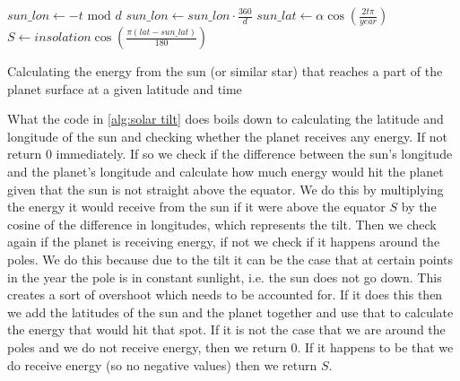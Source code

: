 \begin{algorithm}
    $sun\_lon \leftarrow -t \text{ mod } d$ \;
    $sun\_lon \leftarrow sun\_lon \cdot \frac{360}{d}$ \;
    $sun\_lat \leftarrow \alpha\cos(\frac{2t\pi}{year})$ \;
    $S \leftarrow insolation\cos(\frac{\pi(lat - sun\_lat)}{180})$ \;

     
    \caption{Calculating the energy from the sun (or similar star) that reaches a part of the planet surface at a given latitude and time}
    \label{alg:solar tilt}
\end{algorithm}

What the code in \autoref{alg:solar tilt} does boils down to calculating the latitude and longitude of the sun and checking whether the planet receives any energy. If not return $0$ immediately.
If so we check if the difference between the sun's longitude and the planet's longitude and calculate how much energy would hit the planet given that the sun is not straight above the equator. 
We do this by multiplying the energy it would receive from the sun if it were above the equator $S$ by the cosine of the difference in longitudes, which represents the tilt. Then we check again 
if the planet is receiving energy, if not we check if it happens around the poles. We do this because due to the tilt it can be the case that at certain points in the year the pole is in constant
sunlight, i.e. the sun does not go down. This creates a sort of overshoot which needs to be accounted for. If it does this then we add the latitudes of the sun and the planet together and use
that to calculate the energy that would hit that spot. If it is not the case that we are around the poles and we do not receive energy, then we return $0$. If it happens to be that we do receive 
energy (so no negative values) then we return $S$.

